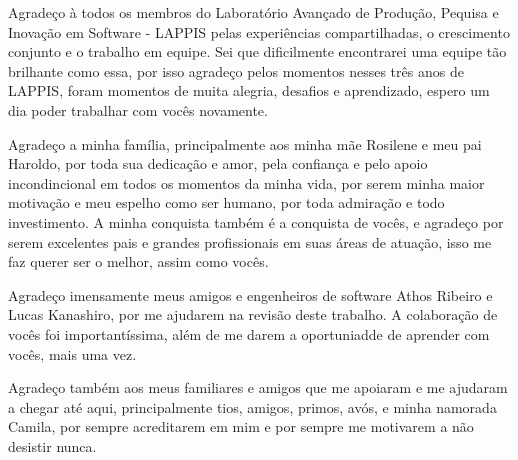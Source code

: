 \begin{agradecimentos}
Agradeço à todos os membros do Laboratório Avançado de Produção, Pequisa e
Inovação em Software - LAPPIS pelas experiências compartilhadas, o crescimento conjunto
 e o trabalho em equipe. Sei que dificilmente encontrarei uma equipe tão brilhante
como essa, por isso agradeço pelos momentos nesses três anos de LAPPIS, foram momentos de muita alegria,
desafios e aprendizado, espero um dia poder trabalhar com vocês novamente.

Agradeço a minha família, principalmente aos minha mãe Rosilene e meu pai Haroldo,
por toda sua dedicação e amor, pela confiança e pelo apoio incondincional em todos
os momentos da minha vida, por serem minha maior motivação e meu espelho como
ser humano, por toda admiração e todo investimento. A minha conquista também é
a conquista de vocês, e agradeço por serem excelentes pais e grandes profissionais em suas
áreas de atuação, isso me faz querer ser o melhor, assim como vocês.

Agradeço imensamente meus amigos e engenheiros de software Athos Ribeiro e Lucas
Kanashiro, por me ajudarem na revisão deste trabalho. A colaboração de vocês foi 
importantíssima, além de me darem a oportuniadde de aprender com vocês, 
mais uma vez.

Agradeço também aos meus familiares e amigos que me apoiaram e me ajudaram a chegar
até aqui, principalmente tios, amigos, primos, avós, e minha namorada Camila, por
sempre acreditarem em mim e por sempre me motivarem a não desistir nunca.
\end{agradecimentos}
